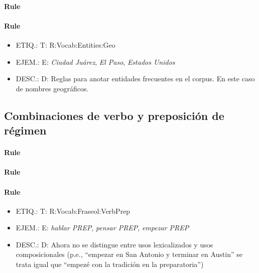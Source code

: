 \documentclass[11pt]{report}
\begin{document}
\paragraph*{Rule}
\paragraph*{Rule}
\begin{itemize}
\item ETIQ.:  T: R:Vocab:Entities:Geo
\item EJEM.:  E: \emph{Ciudad Juárez}, \emph{El Paso}, \emph{Estados Unidos}  
\item DESC.:  D: Reglas para anotar entidades frecuentes en el corpus. En este caso de nombres geográficos.
\end{itemize}

\subsection{Combinaciones de verbo y preposición de régimen}
\paragraph*{Rule}
\paragraph*{Rule}
\paragraph*{Rule}
\begin{itemize}
\item ETIQ.:  T: R:Vocab:Fraseol:VerbPrep
\item EJEM.:  E: \emph{hablar PREP}, \emph{pensar PREP}, \emph{empezar PREP}  
\item DESC.:  D: Ahora no se distingue entre usos lexicalizados y usos composicionales (p.e., ``empezar en San Antonio y terminar en Austin'' se trata igual que ``empezé con la tradición en la preparatoria'') 
\end{itemize}
\end{document}
